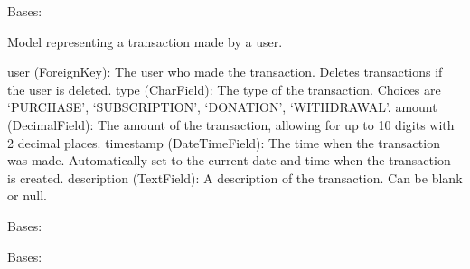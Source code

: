\documentclass[letterpaper,10pt,english]{sphinxmanual}
\begin{document}
\begin{fulllineitems}
\label{\detokenize{modules/models:finances.models.Transaction}}
\pysigstartsignatures
{}
\pysigstopsignatures
\sphinxAtStartPar
Bases: 

\sphinxAtStartPar
Model representing a transaction made by a user.
\begin{description}
\sphinxAtStartPar
user (ForeignKey): The user who made the transaction. Deletes transactions if the user is deleted.
type (CharField): The type of the transaction. Choices are ‘PURCHASE’, ‘SUBSCRIPTION’, ‘DONATION’, ‘WITHDRAWAL’.
amount (DecimalField): The amount of the transaction, allowing for up to 10 digits with 2 decimal places.
timestamp (DateTimeField): The time when the transaction was made. Automatically set to the current date and time when the transaction is created.
description (TextField): A description of the transaction. Can be blank or null.

\end{description}

\begin{fulllineitems}
\label{\detokenize{modules/models:finances.models.Transaction.DoesNotExist}}
\pysigstartsignatures
{}
\pysigstopsignatures
\sphinxAtStartPar
Bases: 

\end{fulllineitems}


\begin{fulllineitems}
\label{\detokenize{modules/models:finances.models.Transaction.MultipleObjectsReturned}}
\pysigstartsignatures
{}
\pysigstopsignatures
\sphinxAtStartPar
Bases: 

\end{fulllineitems}


\end{fulllineitems}
\end{document}
